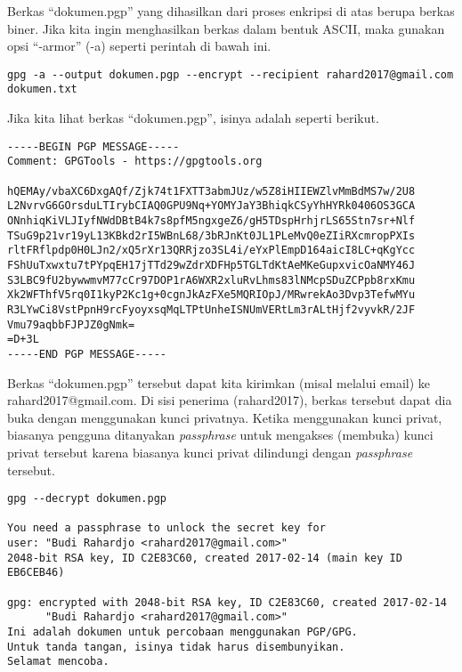 Berkas ``dokumen.pgp'' yang dihasilkan dari proses enkripsi di atas berupa
berkas biner. Jika kita ingin menghasilkan berkas dalam bentuk ASCII, maka
gunakan opsi ``-armor'' (-a) seperti perintah di bawah ini.

\begin{verbatim}
gpg -a --output dokumen.pgp --encrypt --recipient rahard2017@gmail.com dokumen.txt
\end{verbatim}

Jika kita lihat berkas ``dokumen.pgp'', isinya adalah seperti berikut.

\begin{mdframed}[userdefinedwidth=400]
\begin{verbatim}
-----BEGIN PGP MESSAGE-----
Comment: GPGTools - https://gpgtools.org

hQEMAy/vbaXC6DxgAQf/Zjk74t1FXTT3abmJUz/w5Z8iHIIEWZlvMmBdMS7w/2U8
L2NvrvG6GOrsduLTIrybCIAQ0GPU9Nq+YOMYJaY3BhiqkCSyYhHYRk0406OS3GCA
ONnhiqKiVLJIyfNWdDBtB4k7s8pfM5ngxgeZ6/gH5TDspHrhjrLS65Stn7sr+Nlf
TSuG9p21vr19yL13KBkd2rI5WBnL68/3bRJnKt0JL1PLeMvQ0eZIiRXcmropPXIs
rltFRflpdp0H0LJn2/xQ5rXr13QRRjzo3SL4i/eYxPlEmpD164aicI8LC+qKgYcc
FShUuTxwxtu7tPYpqEH17jTTd29wZdrXDFHp5TGLTdKtAeMKeGupxvicOaNMY46J
S3LBC9fU2bywwmvM77cCr97DOP1rA6WXR2xluRvLhms83lNMcpSDuZCPpb8rxKmu
Xk2WFThfV5rq0I1kyP2Kc1g+0cgnJkAzFXe5MQRIOpJ/MRwrekAo3Dvp3TefwMYu
R3LYwCi8VstPpnH9rcFyoyxsqMqLTPtUnheISNUmVERtLm3rALtHjf2vyvkR/2JF
Vmu79aqbbFJPJZ0gNmk=
=D+3L
-----END PGP MESSAGE-----
\end{verbatim}
\end{mdframed}

Berkas ``dokumen.pgp'' tersebut dapat kita kirimkan (misal melalui email) ke
rahard2017@gmail.com. Di sisi penerima (rahard2017), berkas tersebut dapat dia
buka dengan menggunakan kunci privatnya. Ketika menggunakan kunci privat,
biasanya pengguna ditanyakan {\em passphrase} untuk mengakses (membuka) kunci
privat tersebut karena biasanya kunci privat dilindungi dengan {\em passphrase}
tersebut.

\begin{mdframed}[userdefinedwidth=400]
\begin{verbatim}
gpg --decrypt dokumen.pgp

You need a passphrase to unlock the secret key for
user: "Budi Rahardjo <rahard2017@gmail.com>"
2048-bit RSA key, ID C2E83C60, created 2017-02-14 (main key ID EB6CEB46)

gpg: encrypted with 2048-bit RSA key, ID C2E83C60, created 2017-02-14
      "Budi Rahardjo <rahard2017@gmail.com>"
Ini adalah dokumen untuk percobaan menggunakan PGP/GPG.
Untuk tanda tangan, isinya tidak harus disembunyikan.
Selamat mencoba.
\end{verbatim}
\end{mdframed}

